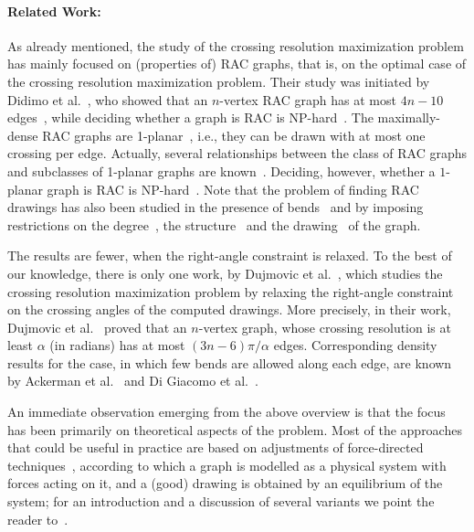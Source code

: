 \documentclass{comjnl}
\begin{document}
\paragraph{Related Work:}
As already mentioned, the study of the crossing resolution maximization problem has mainly focused on (properties of) RAC graphs, that is, on the optimal case of the crossing resolution maximization problem. Their study was initiated by Didimo et al.~\cite{DBLP:journals/tcs/DidimoEL11}, who showed that an $n$-vertex RAC graph has at most $4n-10$ edges~\cite{DBLP:journals/tcs/DidimoEL11}, while deciding whether a graph is RAC is NP-hard~\cite{DBLP:journals/jgaa/ArgyriouBS12}. The maximally-dense RAC graphs are 1-planar~\cite{DBLP:journals/dam/EadesL13}, i.e., they can be drawn with at most one crossing per edge. Actually, several relationships between the class of RAC graphs and subclasses of 1-planar graphs are known~\cite{DBLP:journals/dam/BachmaierBHNR17,DBLP:journals/tcs/BrandenburgDEKL16}. Deciding, however, whether a $1$-planar graph is RAC is NP-hard~\cite{DBLP:journals/tcs/BekosDLMM17}. Note that the problem of finding RAC drawings has also been studied in the presence of bends~\cite{DBLP:journals/jgaa/AngeliniCDFBKS11,DBLP:journals/comgeo/ArikushiFKMT12,DBLP:journals/tcs/DidimoEL11,DBLP:journals/mst/GiacomoDLM11} and by imposing restrictions on the degree~\cite{DBLP:conf/s-egc/AngeliniBDFHKLL11}, the structure~\cite{DBLP:journals/ipl/DidimoEL10} and the drawing~\cite{DBLP:journals/algorithmica/GiacomoDEL14,DBLP:conf/wg/HongN15} of the graph. 

The results are fewer, when the right-angle constraint is relaxed. To the best of our knowledge, there is only one work, by Dujmovic et al.~\cite{DBLP:journals/cjtcs/DujmovicGMW11}, which studies the crossing resolution maximization problem by relaxing the right-angle constraint on the crossing angles of the computed drawings. More precisely, in their work, Dujmovic et al.~\cite{DBLP:journals/cjtcs/DujmovicGMW11} proved that an $n$-vertex graph, whose crossing resolution is at least $\alpha$ (in radians) has at most $(3n-6)\pi/\alpha$ edges. Corresponding density results for the case, in which few bends are allowed along each edge, are known by Ackerman et al.~\cite{DBLP:journals/siamdm/AckermanFT12} and Di Giacomo et al.~\cite{DBLP:journals/mst/GiacomoDLM11}.

An immediate observation emerging from the above overview is that the focus has been primarily on theoretical aspects of the problem. Most of the approaches that could be useful in practice are based on adjustments of force-directed techniques~\cite{DBLP:journals/congnum/Eades84}, according to which a graph is modelled as a physical system with forces acting on it, and a (good) drawing is obtained by an equilibrium of the system; for an introduction and a discussion of several variants we point the reader to~\cite{DBLP:books/ph/BattistaETT99}. 
\end{document}
